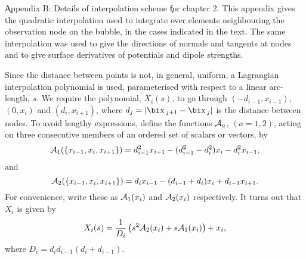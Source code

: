\c {\bigrm Appendix B: Details of interpolation scheme}
\c {\bigrm for chapter 2.}
\vskip 15pt
This appendix gives the quadratic interpolation used to integrate over
elements neighbouring the observation node on the bubble, in the cases
indicated in the text. The same interpolation was used to give the
directions of normals and tangents at nodes and to give surface
derivatives of potentials and dipole strengths.

Since the distance between points is not, in general, uniform, a
Lagrangian interpolation polynomial is used, parameterised
with respect to a linear arc-length, $s$. We require the polynomial, $X_i(s)$,
to go through $(-d_{i-1},x_{i-1})$, $(0,x_i)$ 
and $(d_i,x_{i+1})$, where
$d_j=|\bd{x}_{j+1}-\bd{x}_j|$ is the distance between nodes.
To avoid lengthy expressions, define the functions
${\cal A}_a$, $(a=1,2)$, acting on three consecutive members of an
ordered set of scalars or vectors, by
$${\cal A}_1(\{x_{i-1},x_i,x_{i+1}\})=d_{i-1}^2x_{i+1}-(d_{i-1}^2-d_i^2)
x_i-d_i^2x_{i-1},$$
and
$${\cal A}_2(\{x_{i-1},x_i,x_{i+1}\})=d_ix_{i-1}-(d_{i-1}+d_i)x_i+
d_{i-1}x_{i+1}.$$
For convenience, write these as ${\cal A}_1(x_i)$ and ${\cal A}_2(x_i)$
respectively.
It turns out that $X_i$ is given by
$$X_i(s)={1\over D_i}\left(s^2{\cal A}_2(x_i)+s{\cal A}_1(x_i)\right)+x_i,$$
where $D_i=d_id_{i-1}(d_i+d_{i-1})$.

